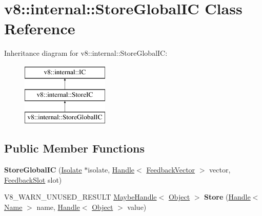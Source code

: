 \hypertarget{classv8_1_1internal_1_1StoreGlobalIC}{}\section{v8\+:\+:internal\+:\+:Store\+Global\+IC Class Reference}
\label{classv8_1_1internal_1_1StoreGlobalIC}
Inheritance diagram for v8\+:\+:internal\+:\+:Store\+Global\+IC\+:\begin{figure}[H]
\begin{center}
\leavevmode
\includegraphics[height=3.000000cm]{classv8_1_1internal_1_1StoreGlobalIC}
\end{center}
\end{figure}
\subsection*{Public Member Functions}
\begin{DoxyCompactItemize}
\item 
\mbox{\label{classv8_1_1internal_1_1StoreGlobalIC_a8b02c32b54230974235c810be24d3c32}} 
{\bfseries Store\+Global\+IC} (\mbox{\hyperlink{classv8_1_1internal_1_1Isolate}{Isolate}} $\ast$isolate, \mbox{\hyperlink{classv8_1_1internal_1_1Handle}{Handle}}$<$ \mbox{\hyperlink{classv8_1_1internal_1_1FeedbackVector}{Feedback\+Vector}} $>$ vector, \mbox{\hyperlink{classv8_1_1internal_1_1FeedbackSlot}{Feedback\+Slot}} slot)
\item 
\mbox{\label{classv8_1_1internal_1_1StoreGlobalIC_af4d21e6881cb8a9bd6d5630774d7da5e}} 
V8\+\_\+\+W\+A\+R\+N\+\_\+\+U\+N\+U\+S\+E\+D\+\_\+\+R\+E\+S\+U\+LT \mbox{\hyperlink{classv8_1_1internal_1_1MaybeHandle}{Maybe\+Handle}}$<$ \mbox{\hyperlink{classv8_1_1internal_1_1Object}{Object}} $>$ {\bfseries Store} (\mbox{\hyperlink{classv8_1_1internal_1_1Handle}{Handle}}$<$ \mbox{\hyperlink{classv8_1_1internal_1_1Name}{Name}} $>$ name, \mbox{\hyperlink{classv8_1_1internal_1_1Handle}{Handle}}$<$ \mbox{\hyperlink{classv8_1_1internal_1_1Object}{Object}} $>$ value)
\end{DoxyCompactItemize}

